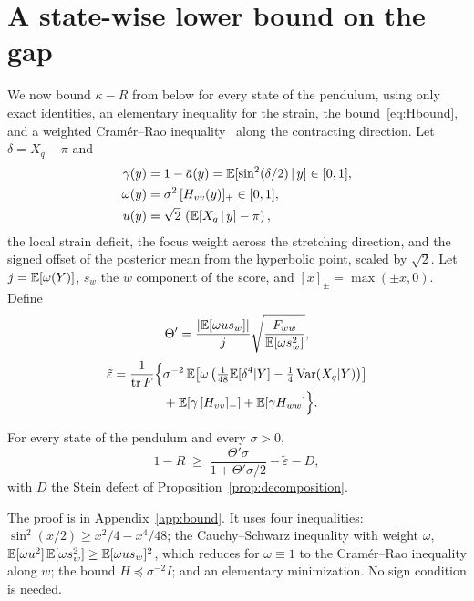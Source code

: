 \section{A state-wise lower bound on the gap}
\label{sec:bound}

We now bound $\kappa - R$ from below for every state of the pendulum, using only exact identities, an elementary inequality for the strain, the bound~\eqref{eq:Hbound}, and a weighted Cram\'er--Rao inequality~\cite{rao1945,cramer1946} along the contracting direction. Let $\delta = X_q - \pi$ and
\begin{align}
\gamma(y) &= 1 - \bar a(y) = \mathbb{E}[\sin^2(\delta/2)\,|\,y] \in [0,1], \\
\omega(y) &= \sigma^2\,[H_{vv}(y)]_+ \in [0,1], \\
u(y) &= \sqrt2\,\left(\mathbb{E}[X_q\,|\,y] - \pi\right),
\end{align}
the local strain deficit, the focus weight across the stretching direction, and the signed offset of the posterior mean from the hyperbolic point, scaled by $\sqrt2$. Let $j = \mathbb{E}[\omega(Y)]$, $s_w$ the $w$ component of the score, and $[x]_\pm = \max(\pm x, 0)$. Define
\begin{equation}
\Theta' = \frac{|\mathbb{E}[\omega u s_w]|}{j}\sqrt{\frac{F_{ww}}{\mathbb{E}[\omega s_w^2]}},
\label{eq:Theta}
\end{equation}
\begin{align}
\tilde\varepsilon = \frac{1}{\operatorname{tr} F}\Bigl\{&\sigma^{-2}\,\mathbb{E}\!\left[\omega\left(\tfrac{1}{48}\mathbb{E}[\delta^4|Y] - \tfrac14\operatorname{Var}(X_q|Y)\right)\right] \nonumber\\
&+ \mathbb{E}\!\left[\gamma\,[H_{vv}]_-\right] + \mathbb{E}[\gamma H_{ww}]\Bigr\}.
\label{eq:epstilde}
\end{align}

\begin{theorem}
\label{thm:statewise}
For every state of the pendulum and every $\sigma > 0$,
\begin{equation}
1 - R \;\geq\; \frac{\Theta'\sigma}{1 + \Theta'\sigma/2} - \tilde\varepsilon - D ,
\label{eq:statewise}
\end{equation}
with $D$ the Stein defect of Proposition~\ref{prop:decomposition}.
\end{theorem}

The proof is in Appendix~\ref{app:bound}. It uses four inequalities: $\sin^2(x/2) \geq x^2/4 - x^4/48$; the Cauchy--Schwarz inequality with weight $\omega$, $\mathbb{E}[\omega u^2]\,\mathbb{E}[\omega s_w^2] \geq \mathbb{E}[\omega u s_w]^2$, which reduces for $\omega \equiv 1$ to the Cram\'er--Rao inequality along $w$; the bound $H \preceq \sigma^{-2}I$; and an elementary minimization. No sign condition is needed.

